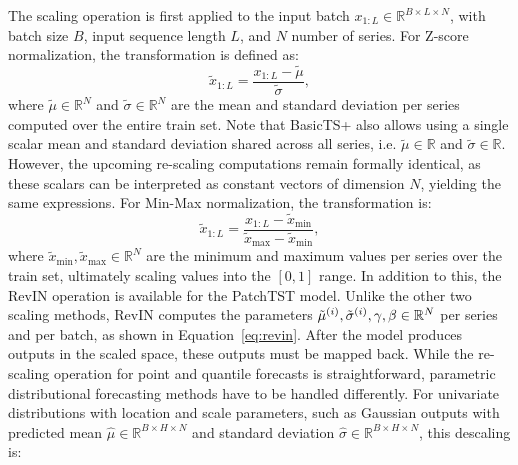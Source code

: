 \documentclass[a4paper,oneside,bibliography=totoc]{scrbook}
\begin{document}
The scaling operation is first applied to the input batch \( x_{1:L} \in \mathbb{R}^{B \times L \times N} \), with batch size $B$, input sequence length $L$, and \( N \) number of series. 
For Z-score normalization, the transformation is defined as:
\begin{equation}
\tilde{x}_{1:L} = \frac{x_{1:L} - \tilde{\mu}}{\tilde{\sigma}},
\end{equation}
where \( \tilde{\mu} \in \mathbb{R}^{N} \) and \( \tilde{\sigma} \in \mathbb{R}^{N} \) are the mean and standard deviation per series computed over the entire train set. %
Note that BasicTS+ also allows using a single scalar mean and standard deviation shared across all series, i.e. \( \tilde{\mu} \in \mathbb{R} \) and \( \tilde{\sigma} \in \mathbb{R} \). 
However, the upcoming re-scaling computations remain formally identical, as these scalars can be interpreted as constant vectors of dimension $N$, yielding the same expressions.
For Min-Max normalization, the transformation is:
\begin{equation}
\tilde{x}_{1:L} = \frac{x_{1:L} - \tilde{x}_{\min}}{\tilde{x}_{\max} - \tilde{x}_{\min}},
\end{equation}
where \( \tilde{x}_{\min}, \tilde{x}_{\max} \in \mathbb{R}^{N} \) are the minimum and maximum values per series over the train set, ultimately scaling values into the \([0,1]\) range.
In addition to this, the RevIN operation \cite{kim_reversible_2021} is available for the PatchTST model. Unlike the other two scaling methods, RevIN computes the parameters $\tilde{\mu}^{(i)}, \space \tilde{\sigma}^{(i)}, \space \gamma, \space \beta \in \mathbb{R}^N$ per series and per batch, as shown in Equation~\ref{eq:revin}.
After the model produces outputs in the scaled space, these outputs must be mapped back. 
While the re-scaling operation for point and quantile forecasts is straightforward, parametric distributional forecasting methods have to be handled differently.
For univariate distributions with location and scale parameters, such as Gaussian outputs with predicted mean \( \hat{\mu} \in \mathbb{R}^{B \times H \times N}\) and standard deviation \( \hat{\sigma} \in \mathbb{R}^{B \times H \times N}\), this descaling is:
\end{document}
